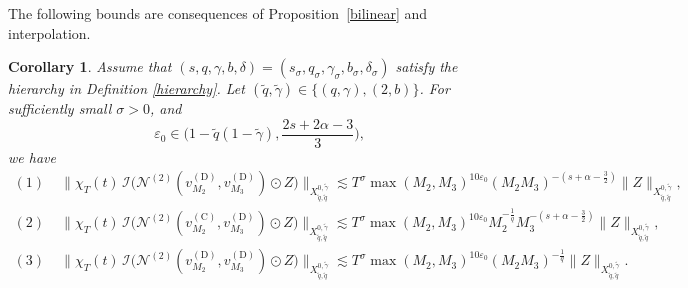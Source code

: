 \documentclass[11pt,reqno,english]{amsart}
\numberwithin{equation}{section}
\theoremstyle{plain}
\newtheorem{corollary}[theorem]{Corollary}
\theoremstyle{definition}
\theoremstyle{remark}
\renewcommand{\epsilon}{\varepsilon}
\newcommand{\dotcirc}{\mathbin{\odot}}
\begin{document}
The following bounds are consequences of Proposition~\ref{bilinear} and interpolation.
\begin{corollary}\label{co:2-linear:1}
	Assume that $(s,q,\gamma,b,\delta)=(s_{\sigma},q_{\sigma},\gamma_{\sigma},b_{\sigma},\delta_{\sigma})$ satisfy the hierarchy in Definition \ref{hierarchy}.
	Let $(\widetilde{q},\widetilde{\gamma})\in\{(q,\gamma),(2,b)\}$.
	For sufficiently small $\sigma>0$, and
	$$\epsilon_0\in\big(1-\widetilde{q}(1-\widetilde{\gamma}), \frac{2s+2\alpha-3}{3}\big),$$ we have
	\begin{align*}
		\mathrm{(1)} \; &
		\|\chi_T(t)\,\mathcal{I}\big(\mathcal{N}^{(2)}(v_{M_2}^{(\mathrm{D})},v_{M_3}^{(\mathrm{D})})\dotcirc Z\big) \|_{X_{\widetilde{q},\widetilde{q}}^{0,\widetilde{\gamma}}}
		\lesssim T^{\sigma}\max(M_2,M_3)^{10\epsilon_0}(M_2 M_3)^{-(s+\alpha-\frac32)}\|Z\|_{X_{\widetilde{q},\widetilde{q}}^{0,\widetilde{\gamma}}},\\
		\mathrm{(2)} \; &
		\|\chi_T(t)\,\mathcal{I}\big(\mathcal{N}^{(2)}(v_{M_2}^{(\mathrm{C})},v_{M_3}^{(\mathrm{D})})\dotcirc Z\big) \|_{X_{\widetilde{q},\widetilde{q}}^{0,\widetilde{\gamma}}}\lesssim T^{\sigma}\max(M_2,M_3)^{10\epsilon_0}
		M_2^{-\frac1q}
		M_3^{-(s+\alpha-\frac32)} \|Z\|_{X_{\widetilde{q},\widetilde{q}}^{0,\widetilde{\gamma}}},\\
		\mathrm{(3)}  &
		\|\chi_T(t)\,\mathcal{I}\big(\mathcal{N}^{(2)}(v_{M_2}^{(\mathrm{D})},v_{M_3}^{(\mathrm{D})})\dotcirc Z\big) \|_{X_{\widetilde{q},\widetilde{q}}^{0,\widetilde{\gamma}}}
		\lesssim T^{\sigma}
		\max(M_2,M_3)^{10\epsilon_0}(M_2 M_3)^{-\frac{1}{q}}
		\|Z\|_{X_{\widetilde{q},\widetilde{q}}^{0,\widetilde{\gamma}}}.
	\end{align*}
\end{corollary}
\end{document}
